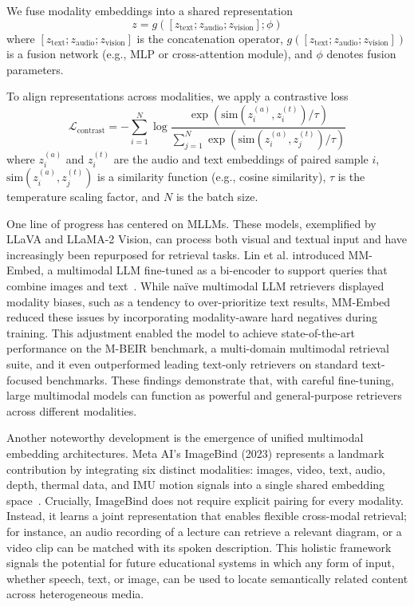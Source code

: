 We fuse modality embeddings into a shared representation
\begin{equation*}
    z = g([z_{\text{text}}; z_{\text{audio}}; z_{\text{vision}}]; \phi)
\end{equation*}
where $[z_{\text{text}}; z_{\text{audio}}; z_{\text{vision}}]$ is the concatenation operator, $g([z_{\text{text}}; z_{\text{audio}}; z_{\text{vision}}])$ is a fusion network (e.g., MLP or cross-attention module), and $\phi$ denotes fusion parameters.

To align representations across modalities, we apply a contrastive loss
\begin{equation*}
    \mathcal{L}_{\text{contrast}} = -\sum_{i=1}^{N} \log
    \frac{\exp(\mathrm{sim}(z_i^{(a)}, z_i^{(t)}) / \tau)}
    {\sum_{j=1}^{N} \exp(\mathrm{sim}(z_i^{(a)}, z_j^{(t)}) / \tau)}
\end{equation*}
where $z_i^{(a)}$ and $z_i^{(t)}$ are the audio and text embeddings of paired sample $i$, $\mathrm{sim}(z_i^{(a)}, z_j^{(t)})$ is a similarity function (e.g., cosine similarity), $\tau$ is the temperature scaling factor, and $N$ is the batch size.


One line of progress has centered on MLLMs. These models, exemplified by LLaVA and LLaMA-2 Vision, can process both visual and textual input and have increasingly been repurposed for retrieval tasks. Lin et al. introduced MM-Embed, a multimodal LLM fine-tuned as a bi-encoder to support queries that combine images and text~\cite{lin2024mmembed}. While naïve multimodal LLM retrievers displayed modality biases, such as a tendency to over-prioritize text results, MM-Embed reduced these issues by incorporating modality-aware hard negatives during training. This adjustment enabled the model to achieve state-of-the-art performance on the M-BEIR benchmark, a multi-domain multimodal retrieval suite, and it even outperformed leading text-only retrievers on standard text-focused benchmarks. These findings demonstrate that, with careful fine-tuning, large multimodal models can function as powerful and general-purpose retrievers across different modalities.

Another noteworthy development is the emergence of unified multimodal embedding architectures. Meta AI’s ImageBind (2023) represents a landmark contribution by integrating six distinct modalities: images, video, text, audio, depth, thermal data, and IMU motion signals into a single shared embedding space~\cite{girdhar2023imagebind}. Crucially, ImageBind does not require explicit pairing for every modality. Instead, it learns a joint representation that enables flexible cross-modal retrieval; for instance, an audio recording of a lecture can retrieve a relevant diagram, or a video clip can be matched with its spoken description. This holistic framework signals the potential for future educational systems in which any form of input, whether speech, text, or image, can be used to locate semantically related content across heterogeneous media.

